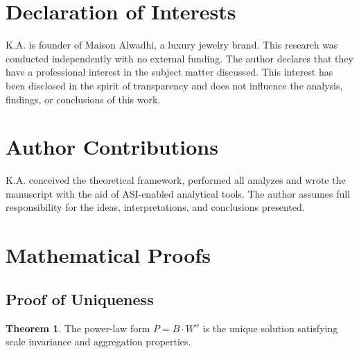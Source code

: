 \documentclass[12pt,a4paper]{article}
\theoremstyle{definition}
\newtheorem{theorem}{Theorem}
\theoremstyle{remark}
\begin{document}
\section*{Declaration of Interests}

K.A. is founder of Maison Alwadhi, a luxury jewelry brand. This research was conducted independently with no external funding. The author declares that they have a professional interest in the subject matter discussed. This interest has been disclosed in the spirit of transparency and does not influence the analysis, findings, or conclusions of this work. 

\section*{Author Contributions}

K.A. conceived the theoretical framework, performed all analyzes and wrote the manuscript with the aid of ASI-enabled analytical tools. The author assumes full responsibility for the ideas, interpretations, and conclusions presented.





\newpage






\appendix

\section{Mathematical Proofs}

\subsection{Proof of Uniqueness}

\begin{theorem}
The power-law form $P = B \cdot W^{\alpha}$ is the unique solution satisfying scale invariance and aggregation properties.
\end{theorem}
\end{document}
